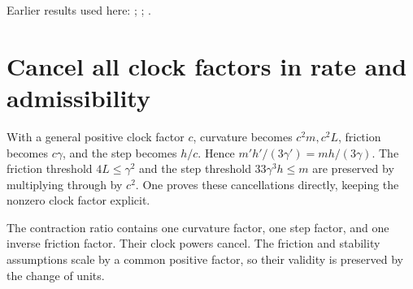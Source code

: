 \documentclass[11pt,a4paper]{article}
\begin{document}
Earlier results used here: \cite[Section~3.1.1]{LangevinLean2026IPLA}; \cite[Section~3.113.3]{LangevinLean2026Kinetic}; \cite[Section~3.20.5]{LangevinLean2026Kinetic}.

\section{\texorpdfstring{Cancel all clock factors in rate and admissibility}{Cancel all clock factors in rate and admissibility}}


With a general positive clock factor \(c\), curvature becomes \(c^2m,c^2L\), friction becomes \(c\gamma\), and the step becomes \(h/c\). Hence \(m\prime h\prime/(3\gamma\prime)=mh/(3\gamma)\). The friction threshold \(4L\le\gamma^2\) and the step threshold \(33\gamma^3h\le m\) are preserved by multiplying through by \(c^2\). One proves these cancellations directly, keeping the nonzero clock factor explicit.



The contraction ratio contains one curvature factor, one step factor, and one inverse friction factor. Their clock powers cancel. The friction and stability assumptions scale by a common positive factor, so their validity is preserved by the change of units.
\end{document}
